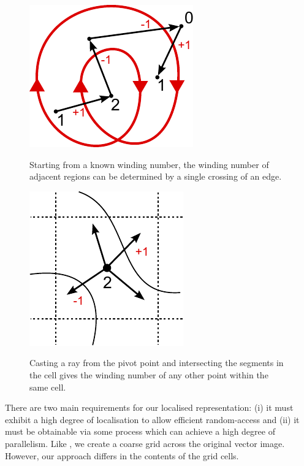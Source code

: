 \documentclass[11pt,a4paper,twoside]{article}
\begin{document}
\begin {figure}
\centering
\begin {minipage} [b] {0.40\linewidth}
	\centering
	\includegraphics [width=0.6\columnwidth]{figures/ray_our}
	\caption {Starting from a known winding number, the winding number of adjacent regions can be determined by a single crossing of an edge.}
	\label {fig:ray_our}
\end {minipage}
\hspace{0.5cm}
\begin{minipage} [b] {0.40\linewidth}
	\centering
	\includegraphics [width=0.6\columnwidth]{figures/cell}
	\caption {Casting a ray from the pivot point and intersecting the segments in the cell gives the winding number of any other point within the same cell.}
	\label {fig:cell}	
\end {minipage}
\end {figure}

There are two main requirements for our localised representation: (i) it must exhibit a high degree of localisation to allow efficient random-access and (ii) it must be obtainable via some process which can achieve a high degree of parallelism. Like \cite{NehabHoppe08}, we create a coarse grid across the original vector image. However, our approach differs in the contents of the grid cells. 
\end{document}
